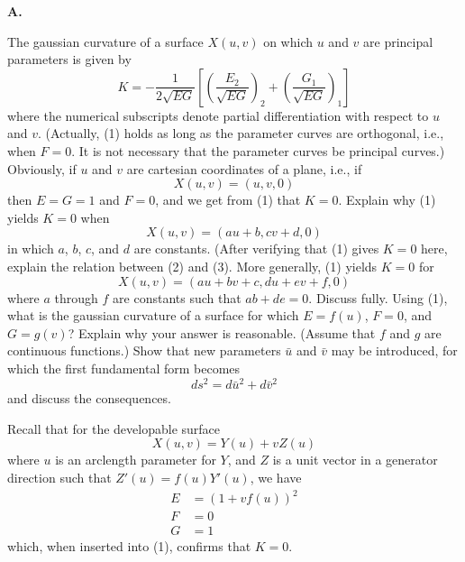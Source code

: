 \documentclass{book}
\begin{document}
\noindent \textbf{A.} 

\vspace{0.3cm}

The gaussian curvature of a surface $X(u,v)$ on which $u$ and $v$ are principal parameters is given by
\begin{equation}
K = - \frac{1}{2\sqrt{EG}} \left[ \left( \frac{E_{2}}{\sqrt{EG}} \right)_{2} + \left( \frac{G_{1}}{\sqrt{EG}} \right)_{1} \right] 
\end{equation}
where the numerical subscripts denote partial differentiation with respect to $u$ and $v$. (Actually, (1) holds as long as the parameter curves are orthogonal, i.e., when $F = 0$. It is not necessary that the parameter curves be principal curves.) Obviously, if $u$ and $v$ are cartesian coordinates of a plane, i.e., if
\begin{equation}
X(u,v) = (u, v, 0)
\end{equation}
then $E = G = 1$ and $F = 0$, and we get from (1) that $K = 0$. Explain why (1) yields $K = 0$ when
\begin{equation}
X(u,v) = (au + b, cv + d, 0)
\end{equation}
in which $a$, $b$, $c$, and $d$ are constants. (After verifying that (1) gives $K = 0$ here, explain the relation between (2) and (3). More generally, (1) yields $K = 0$ for
\begin{equation}
X(u,v) = (au + bv + c,  du + ev + f, 0)
\end{equation}
where $a$ through $f$ are constants such that $ab + de = 0$. Discuss fully. Using (1), what is the gaussian curvature of a surface for which $E = f(u)$, $F = 0$, and $G = g(v)$? Explain why your answer is reasonable. (Assume that $f$ and $g$ are continuous functions.) Show that new parameters $\bar{u}$ and $\bar{v}$ may be introduced, for which the first fundamental form becomes
\begin{equation}
ds^{2} = d \bar{u}^{2} + d \bar{v}^{2}
\end{equation}
and discuss the consequences.

Recall that for the developable surface
\begin{equation}
X(u,v) = Y(u) + vZ(u)
\end{equation}
where $u$ is an arclength parameter for $Y$, and $Z$ is a unit vector in a generator direction such that $Z'(u) = f(u) Y'(u)$, we have
\begin{align}
E & = (1 + vf(u))^{2} \\
F & = 0 \\
G & = 1
\end{align}
which, when inserted into (1), confirms that $K = 0$.
\end{document}

